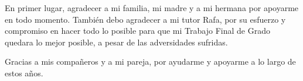 \begin{acknowledgements}

En primer lugar, agradecer a mi familia, mi madre y a mi hermana  por apoyarme en todo momento. También debo agradecer a mi tutor Rafa, por su esfuerzo y compromiso en hacer todo lo posible para que mi Trabajo Final de Grado quedara lo mejor posible, a pesar de las adversidades sufridas.

Gracias a mis compañeros y a mi pareja, por ayudarme y apoyarme a lo largo de estos años.



\end{acknowledgements}



